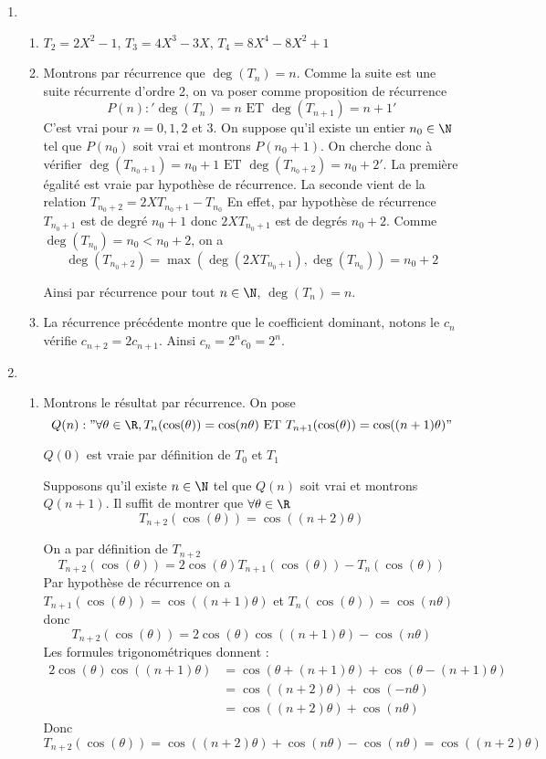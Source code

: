 \documentclass[a4paper, 11pt,reqno]{article}
\begin{document}
\begin{cor}
\begin{enumerate}
\item \begin{enumerate}
\item $T_2 = 2X^2-1$, $T_3 =4X^3-3X$, $T_4 = 8X^4 -8X^2+1 $
\item Montrons par récurrence que $\deg(T_n) =n$. 
Comme la suite est une suite récurrente d'ordre 2, on va poser comme proposition de récurrence $$P(n) : ' \deg(T_n) =n \text{ ET } \deg(T_{n+1}) =n+1'$$
C'est vrai pour $n=0,1,2$ et $3$.  On suppose qu'il existe un entier $n_0\in \N$ tel que $P(n_0)$ soit vrai et montrons $P(n_0+1)$. 
On cherche donc à vérifier $\deg(T_{n_0+1}) =n_0+1 \text{ ET } \deg(T_{n_0+2}) =n_0+2'$. La première égalité est vraie par hypothèse de récurrence. 
La seconde vient de la relation $T_{n_0+2} =2 X T_{n_0+1} -T_{n_0}$
En effet, par hypothèse de récurrence $T_{n_0+1}$ est de degré $n_0+1$ donc $2 X T_{n_0+1}$ est de degrés $n_0 +2$. Comme $\deg(T_{n_0}) =n_0<n_0+2$, on a 
$$\deg(T_{n_0+2} )=\max(\deg(2 X T_{n_0+1}),\deg(T_{n_0})) = n_0+2$$

Ainsi par récurrence pour tout $n\in \N$, $\deg(T_n)= n$.
\item La récurrence précédente montre que le coefficient dominant, notons le $c_n$ vérifie $c_{n+2} = 2 c_{n+1}$. Ainsi $c_n = 2^nc_0 =2^n$. 

\end{enumerate}
\item 
\begin{enumerate}
\item Montrons le résultat par récurrence. On pose 
$$Q(n) : " \forall \theta\in \R, T_n(\cos(\theta)) =\cos(n\theta)  \text{ ET } T_{n+1}(\cos(\theta)) =\cos((n+1)\theta)"$$

$Q(0)$ est vraie par définition de $T_0 $ et $T_1$ 

Supposons qu'il existe $n\in \N$ tel que $Q(n)$ soit vrai et montrons $Q(n+1)$. Il suffit de montrer que $\forall \theta \in \R$
$$T_{n+2}(\cos(\theta) )=\cos((n+2)\theta)$$

On a par définition de $T_{n+2}$ 
$$T_{n+2} (\cos(\theta))  = 2\cos(\theta) T_{n+1}(\cos(\theta)) -T_n(\cos(\theta))$$
Par hypothèse de récurrence on a 
$T_{n+1}(\cos(\theta)) =\cos((n+1)\theta)$ et 
$T_{n}(\cos(\theta))=\cos(n\theta) $ donc  
$$T_{n+2} (\cos(\theta)) =2 \cos(\theta) \cos((n+1) \theta) - \cos(n \theta)$$
Les formules trigonométriques donnent : 
\begin{align*}
2 \cos(\theta) \cos((n+1) \theta)   &=\cos(\theta+(n+1) \theta) +\cos(\theta-(n+1) \theta)\\
&=\cos((n+2) \theta) + \cos(-n\theta)\\
&=\cos((n+2) \theta) + \cos(n\theta)
\end{align*}
Donc 
$$T_{n+2} (\cos(\theta))  = \cos((n+2) \theta) + \cos(n\theta)-\cos(n\theta) = \cos((n+2)\theta)
$$



\end{enumerate}
\end{enumerate}
\end{cor}
\end{document}
